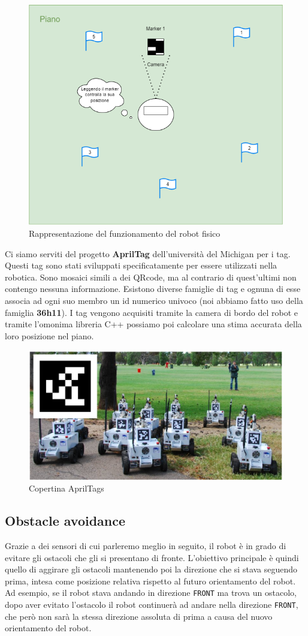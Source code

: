 \documentclass[]{article}
\begin{document}
\begin{figure}[H]
    \centering
    \includegraphics[width=0.6\linewidth]{immagini/diagramma_funzionamento_progetto.drawio.png}
    \caption{Rappresentazione del funzionamento del robot fisico}
\end{figure}

Ci siamo serviti del progetto \textbf{AprilTag} \cite{apriltags} dell'università del Michigan per i tag.
Questi tag sono stati sviluppati specificatamente per essere utilizzati nella robotica. Sono mosaici simili a dei QRcode, ma al contrario di quest'ultimi non contengo nessuna informazione.
Esistono diverse famiglie di tag e ognuna di esse associa ad ogni suo membro un id numerico univoco (noi abbiamo fatto uso della famiglia \textbf{36h11}).
I tag vengono acquisiti tramite la camera di bordo del robot e tramite l'omonima libreria C++\cite{apriltagscpp} possiamo poi calcolare una stima accurata della loro posizione nel piano.
    
\begin{figure}[H]
    \centering
    \includegraphics[width=0.5\linewidth]{immagini/AprilTag.png}
    \caption{Copertina AprilTags}
\end{figure}

\subsection{Obstacle avoidance}
Grazie a dei sensori di cui parleremo meglio in seguito, il robot è in grado di evitare gli ostacoli che gli si presentano di fronte. L'obiettivo principale è quindi quello di aggirare gli ostacoli mantenendo poi la direzione che si stava seguendo prima, intesa come posizione relativa rispetto al futuro orientamento del robot. Ad esempio, se il robot stava andando in direzione \texttt{FRONT} ma trova un ostacolo, dopo aver evitato l'ostacolo il robot continuerà ad andare nella direzione \texttt{FRONT}, che però non sarà la stessa direzione assoluta di prima a causa del nuovo orientamento del robot.
\end{document}
